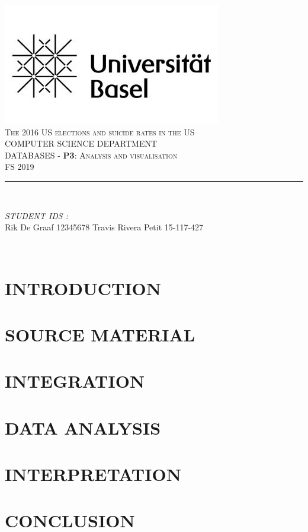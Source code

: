 \documentclass[12pt]{article}
\begin{document}
\begin{titlepage}
	\centering
    \vspace*{0.5 cm}
    \includegraphics[scale = 0.5]{images/unibas_logo.jpeg}\\[1.0 cm]
    \textsc{\LARGE  The 2016 US elections and suicide rates in the US}\\[2.0 cm]
    \textsc{ COMPUTER SCIENCE DEPARTMENT}\\[0.2 cm]
	\textsc{DATABASES - \textbf{P3}: Analysis and visualisation}\\[0.2cm]
	\textsc{\Large FS 2019}\\[0.5 cm]
	\rule{\linewidth}{0.2 mm} \\[0.4 cm]

	\begin{minipage}{0.4\textwidth}

			\begin{flushright}
			\emph{STUDENT IDS :} \\
				Rik De Graaf {\color{red}12345678}\linebreak
			Travis Rivera Petit 15-117-427\linebreak
		\end{flushright}
	\end{minipage}\\[2 cm]


	\vfill

\end{titlepage}



\section{INTRODUCTION}


\section{SOURCE MATERIAL}


\section{INTEGRATION}


\section{DATA ANALYSIS}


\section{INTERPRETATION}


\section{CONCLUSION}



%
%
\end{document}
